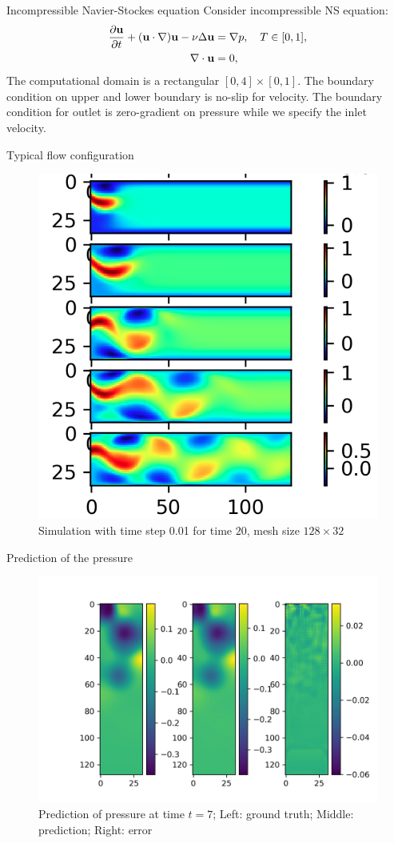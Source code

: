 \documentclass{beamer}
\begin{document}
\begin{frame}{Incompressible Navier-Stockes equation}
	Consider incompressible NS equation:
	\begin{equation}\label{FN}
    \begin{aligned}
        	\frac{\partial \mathbf{u}}{\partial t} + (\mathbf{u} \cdot \nabla)\mathbf{u} -  \nu \Delta \mathbf{u} & =   \nabla p, \quad T \in [0, 1], 	\\
		\nabla \cdot \mathbf{u} & = 0,
    \end{aligned}
\end{equation}
	The computational domain is a rectangular $[0, 4]\times [0, 1]$. The boundary condition on upper and lower boundary is no-slip for velocity. The boundary condition for outlet is zero-gradient on pressure while we specify the inlet velocity.
\end{frame}


\begin{frame}{Typical flow configuration}
	\begin{figure}[H]
          \centering
          \centerline{\includegraphics[width=0.6\linewidth]{fig/ns.png}}
          \caption{Simulation with time step 0.01 for time $20$, mesh size $128 \times 32$}
\end{figure}
\end{frame}


\begin{frame}{Prediction of the pressure}
	\begin{figure}[H]
          \centering
          \centerline{\includegraphics[width=0.9\linewidth]{fig/ns_p.jpg}}
          \caption{Prediction of pressure at time $t=7$; Left: ground truth; Middle: prediction; Right: error}
\end{figure}
\end{frame}
\end{document}
